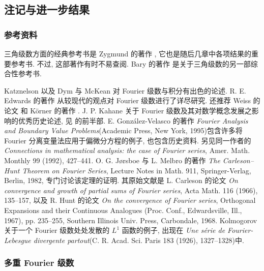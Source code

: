 \subsection{注记与进一步结果}
\label{sec:ch1-notes-further-results}

\subsubsection{参考资料}
\label{subsec:ch1-references}

三角级数方面的经典参考书是 Zygmund 的著作 , 它也是随后几章中各项结果的重要参考书. 不过, 这部著作有时不易查阅. Bary 的著作  是关于三角级数的另一部综合性参考书.

\hypertarget{chapter-01-page-032}{}
Katznelson  以及 Dym 与 McKean  对 Fourier 级数与积分有出色的论述. R. E. Edwards 的著作  从较现代的观点对 Fourier 级数进行了详尽研究. 还推荐 Weiss 的论文  和 Körner 的著作 . J. P. Kahane 关于 Fourier 级数及其对数学概念发展之影响的优秀历史论述, 见  的前半部. E. González-Velasco 的著作 \emph{Fourier Analysis and Boundary Value Problems}(Academic Press, New York, 1995)包含许多将 Fourier 分离变量法应用于偏微分方程的例子, 也包含历史资料. 另见同一作者的 \emph{Connections in mathematical analysis: the case of Fourier series}, Amer. Math. Monthly 99 (1992), 427--441. O. G. Jørsboe 与 L. Melbro 的著作 \emph{The Carleson--Hunt Theorem on Fourier Series}, Lecture Notes in Math. 911, Springer-Verlag, Berlin, 1982, 专门讨论该定理的证明. 其原始文献是 L. Carleson 的论文 \emph{On convergence and growth of partial sums of Fourier series}, Acta Math. 116 (1966), 135--157, 以及 R. Hunt 的论文 \emph{On the convergence of Fourier series}, Orthogonal Expansions and their Continuous Analogues (Proc. Conf., Edwardsville, Ill., 1967), pp. 235--255, Southern Illinois Univ. Press, Carbondale, 1968. Kolmogorov 关于一个 Fourier 级数处处发散的 $L^1$ 函数的例子, 出现在 \emph{Une série de Fourier-Lebesgue divergente partout}(C. R. Acad. Sci. Paris 183 (1926), 1327--1328)中.

\subsubsection{多重 Fourier 级数}
\label{subsec:ch1-multiple-fourier-series}

